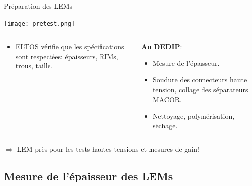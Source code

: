     \begin{frame}{Préparation des LEMs}
    	\begin{scriptsize}
    		\begin{center}
		    	\texttt{[image: pretest.png]}
	    	\end{center}
	    	\begin{columns}
	    		\begin{column}{0.5\textwidth}
	    			\begin{itemize}
	    				\item ELTOS vérifie que les spécifications sont respectées: épaisseurs, RIMs, trous, taille.
	    			\end{itemize}
	    		\end{column}\hfill
	    		\begin{column}{0.5\textwidth}
	    			\textbf{Au DEDIP}:
	    			\begin{itemize}
	    				\item Mesure de l'épaisseur.
	    				\item Soudure des connecteurs haute tension, collage des séparateurs MACOR.
	    				\item Nettoyage, polymérisation, séchage.
	    			\end{itemize}
	    		\end{column}
	    	\end{columns}
	    \end{scriptsize}
	    \vspace{0.5cm}
        $\Rightarrow$ LEM près pour les tests hautes tensions et mesures de gain!
    \end{frame}

    \subsection[Épaisseur]{Mesure de l'épaisseur des LEMs}

